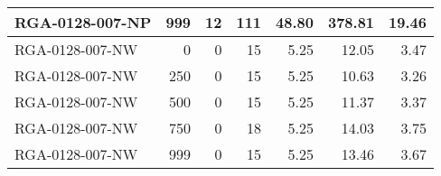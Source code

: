 \begin{table}[htbp]
{\begin{tabular}{lrrrrrr}
    RGA-0128-007-NP & 999    & 12     & 111    & 48.80  & 378.81 & 19.46 \\ \hline
    RGA-0128-007-NW & 0      & 0      & 15     & 5.25   & 12.05  & 3.47 \\
    RGA-0128-007-NW & 250    & 0      & 15     & 5.25   & 10.63  & 3.26 \\
    RGA-0128-007-NW & 500    & 0      & 15     & 5.25   & 11.37  & 3.37 \\
    RGA-0128-007-NW & 750    & 0      & 18     & 5.25   & 14.03  & 3.75 \\
    RGA-0128-007-NW & 999    & 0      & 15     & 5.25   & 13.46  & 3.67 \\
    \bottomrule
    \end{tabular}}
  \label{tab:addlabel}%
\end{table}%

